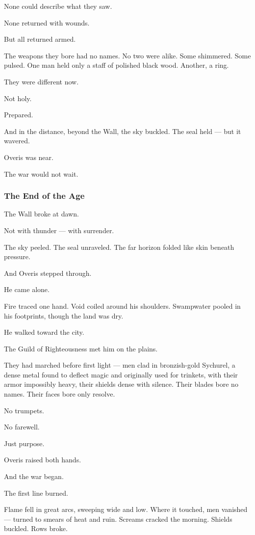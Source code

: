 \documentclass[12pt]{article}
\begin{document}
None could describe what they saw.

None returned with wounds.

But all returned armed.

The weapons they bore had no names. No two were alike. Some shimmered. Some pulsed. One man held only a staff of polished black wood. Another, a ring.

They were different now.

Not holy.

Prepared.

And in the distance, beyond the Wall, the sky buckled. The seal held — but it wavered.

Overis was near.

The war would not wait.


\dotfill

\subsubsection{The End of the Age}

The Wall broke at dawn.

Not with thunder — with surrender.

The sky peeled. The seal unraveled. The far horizon folded like skin beneath pressure.

And Overis stepped through.

He came alone.

Fire traced one hand. Void coiled around his shoulders. Swampwater pooled in his footprints, though the land was dry.

He walked toward the city.

The Guild of Righteousness met him on the plains.

They had marched before first light — men clad in bronzish-gold Sychurel, a dense metal found to deflect magic and originally used for trinkets, with their armor impossibly heavy, their shields dense with silence. Their blades bore no names. Their faces bore only resolve.

No trumpets.

No farewell.

Just purpose.

Overis raised both hands.

And the war began.

The first line burned.

Flame fell in great arcs, sweeping wide and low. Where it touched, men vanished — turned to smears of heat and ruin. Screams cracked the morning. Shields buckled. Rows broke.
\end{document}
